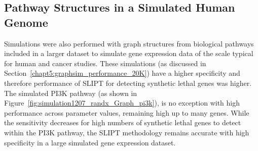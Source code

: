 \FloatBarrier

\subsection{Pathway Structures in a Simulated Human Genome}

\FloatBarrier

Simulations were also performed with graph structures from biological pathways included in a larger dataset to simulate gene expression data of the scale typical for human and cancer studies. These simulations (as discussed in Section~\ref{chapt5:graphsim_performance_20K}) have a higher specificity and therefore performance of \gls{SLIPT} for detecting synthetic lethal genes was higher. The simulated \gls{PI3K} pathway (as shown in Figure~\ref{fig:simulation1207_randx_Graph_pi3k}), is no exception with high performance across parameter values, remaining high up to many genes. While the sensitivity decreases for high numbers of synthetic lethal genes to detect within the \gls{PI3K} pathway, the \gls{SLIPT} methodology remains accurate with high specificity in a large simulated gene expression dataset. 


